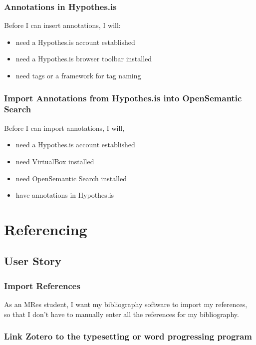 \documentclass{article}
\begin{document}
\subsubsection*{Annotations in Hypothes.is}

Before I can insert annotations, I will:
\begin{itemize}
\item need a Hypothes.is account established
\item need a Hypothes.is browser toolbar installed
\item need tags or a framework for tag naming
\end{itemize}

\subsubsection*{Import Annotations from Hypothes.is into OpenSemantic Search}

Before I can import annotations, I will, 
\begin{itemize}
\item need a Hypothes.is account established
\item need VirtualBox installed
\item need OpenSemantic Search installed
\item have annotations in Hypothes.is
\end{itemize}

\section*{Referencing}

\subsection*{User Story}

\subsubsection*{Import References}

As an MRes student, I want my bibliography software to import my references, so that I don’t have to manually enter all the references for my bibliography.

\subsubsection*{Link Zotero to the typesetting or word progressing program}
\end{document}
